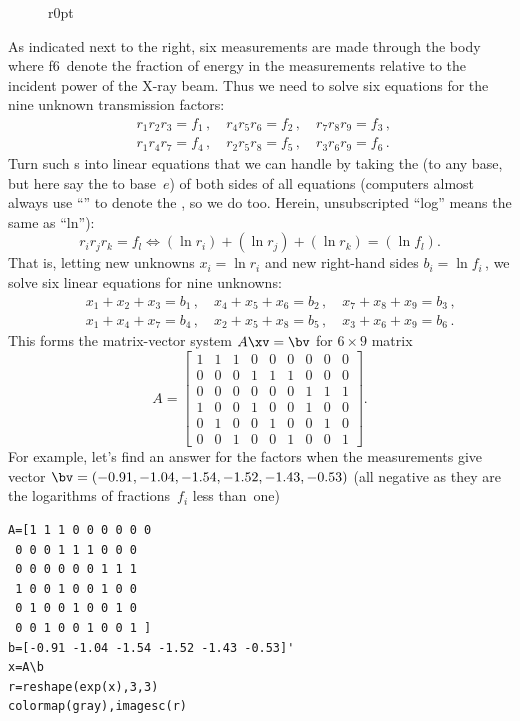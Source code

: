\begin{example}
\begin{figure}[8]r{0pt}  \end{figure}
As indicated next to the right, six  measurements are made through the body where \hlist f6\ denote the fraction of energy in the measurements relative to the incident power of the X-ray beam.
Thus we need to solve six equations for the nine unknown transmission factors:
\begin{eqnarray*}
&&
r_1r_2r_3=f_1\,,\quad
r_4r_5r_6=f_2\,,\quad
r_7r_8r_9=f_3\,,\quad
\\&&
r_1r_4r_7=f_4\,,\quad
r_2r_5r_8=f_5\,,\quad
r_3r_6r_9=f_6\,.\quad
\end{eqnarray*}
Turn such s into linear equations that we can handle by taking the  (to any base, but here say the  to base~\(e\)) of both sides of all equations
(computers almost always use ``'' to denote the , so we do too.  Herein, unsubscripted ``log'' means the same as ``ln''):
\begin{equation*}
r_ir_jr_k=f_l \iff (\ln r_i)+(\ln r_j)+(\ln r_k)=(\ln f_l).
\end{equation*}
That is, letting new unknowns \(x_i=\ln r_i\) and new right-hand sides \(b_i=\ln f_i\)\,, we solve six linear equations for nine unknowns:
\begin{eqnarray*}&&
x_1+x_2+x_3=b_1\,,\quad
x_4+x_5+x_6=b_2\,,\quad
x_7+x_8+x_9=b_3\,,
\\&&
x_1+x_4+x_7=b_4\,,\quad
x_2+x_5+x_8=b_5\,,\quad
x_3+x_6+x_9=b_6\,.
\end{eqnarray*}
This forms the matrix-vector system \(A\xv=\bv\) for \(6\times9\) matrix
\begin{equation*}
A=\begin{bmatrix} 
 1&1&1&0&0&0&0&0&0 \\
 0&0&0&1&1&1&0&0&0 \\
 0&0&0&0&0&0&1&1&1 \\
 1&0&0&1&0&0&1&0&0 \\
 0&1&0&0&1&0&0&1&0 \\
 0&0&1&0&0&1&0&0&1 \end{bmatrix}.
\end{equation*}
For example, let's find an answer for the factors when the measurements give vector \(\sloppy\bv=(-0.91, -1.04, -1.54, -1.52, -1.43, -0.53)\) (all negative as they are the logarithms of fractions~\(f_i\) less than~one)
\setbox\ajrqrbox\hbox{}%
\marginajrbox%
\begin{verbatim}
A=[1 1 1 0 0 0 0 0 0 
 0 0 0 1 1 1 0 0 0 
 0 0 0 0 0 0 1 1 1
 1 0 0 1 0 0 1 0 0 
 0 1 0 0 1 0 0 1 0 
 0 0 1 0 0 1 0 0 1 ]
b=[-0.91 -1.04 -1.54 -1.52 -1.43 -0.53]'
x=A\b
r=reshape(exp(x),3,3)
colormap(gray),imagesc(r)
\end{verbatim}


\end{example}
